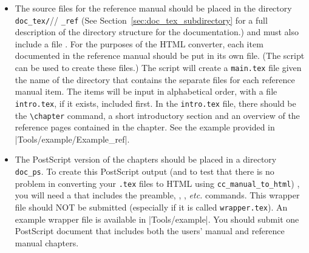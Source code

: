 \begin{itemize}
   \item The source files for the reference manual should be placed in the 
         directory \verb|doc_tex/|//%
         \verb|_ref|%
         (See Section~\ref{sec:doc_tex_subdirectory} for a full description of 
          the directory structure for the documentation.)
         and must also include a file 
         .  For the purposes of the HTML converter, each item 
         documented in the reference manual should be put in its own file. 
         (The script  can be 
          used to create these files.)
         The script  
         will create a 
                  {{\tt main.tex}}
         file given the name of the directory that contains the separate files 
         for each
         reference manual item.  The items will be input in alphabetical order,
         with a file {\tt intro.tex}, if it 
         exists, included first.  In the
                  {{\tt intro.tex}} file, 
         there should be the \verb|\chapter| command,
         a short introductory section and an overview of the reference pages
         contained in the chapter.  See the example provided in
         \nonlinkedpath|Tools/example/Example_ref|. 

   \item The PostScript 
         version of the chapters should be placed in
         a directory \verb|doc_ps|.  
         To create this PostScript output
         (and to test that there is no problem in converting your {\tt .tex}
         files to HTML using {\tt cc\_manual\_to\_html})%
         , 
         you will need
         a  
         that includes the preamble, \verb||,
         \verb||, {\em etc.} commands.  This wrapper file
         should NOT be submitted (especially if it is called {\tt wrapper.tex}).
         An example wrapper file is available in \nonlinkedpath|Tools/example|.  
         You should submit one PostScript document that includes both the
         users' manual and reference manual chapters.
\end{itemize}


